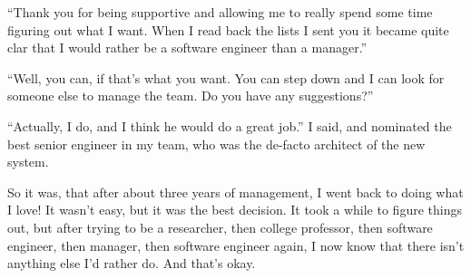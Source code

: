 \documentclass[12pt]{book}
\begin{document}
``Thank you for being supportive and allowing me to really spend some
time figuring out what I want. When I read back the lists I sent you it
became quite clar that I would rather be a software engineer than a
manager.''

``Well, you can, if that's what you want. You can step down and I can
look for someone else to manage the team. Do you have any suggestions?''

``Actually, I do, and I think he would do a great job.'' I said, and
nominated the best senior engineer in my team, who was the de-facto
architect of the new system.

So it was, that after about three years of management, I went back to
doing what I love! It wasn't easy, but it was the best decision. It took
a while to figure things out, but after trying to be a researcher, then
college professor, then software engineer, then manager, then software
engineer again, I now know that there isn't anything else I'd rather do.
And that's okay.
\end{document}
